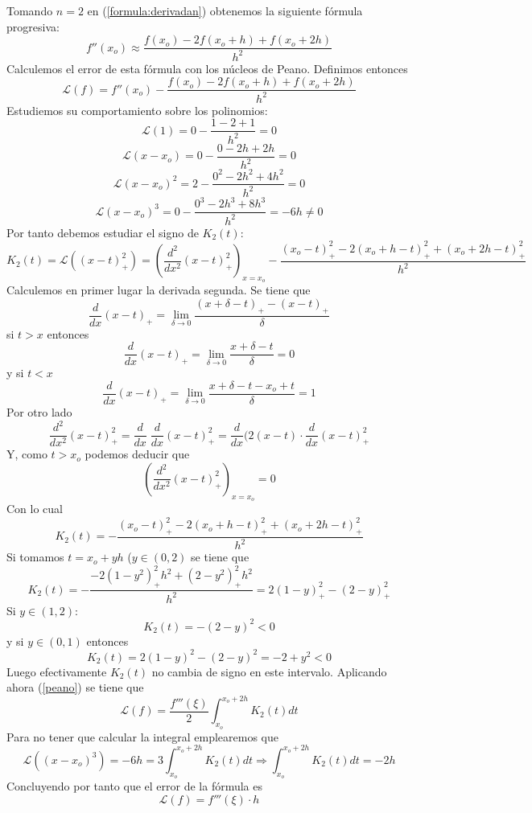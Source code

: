   \begin{ejem}
        Tomando $n=2$ en (\ref{formula:derivadan}) obtenemos la siguiente fórmula progresiva:
        $$f''(x_o)\approx\dfrac{f(x_o)-2f(x_o+h)+f(x_o+2h)}{h^2}$$
        Calculemos el error de esta fórmula con los núcleos de Peano. Definimos entonces
        $$\mathcal{L}(f)=f''(x_o)-\dfrac{f(x_o)-2f(x_o+h)+f(x_o+2h)}{h^2}$$
        Estudiemos su comportamiento sobre los polinomios:
        $$\mathcal{L}(1)=0-\dfrac{1-2+1}{h^2}=0$$
        $$\mathcal{L}(x-x_o)=0-\dfrac{0-2h+2h}{h^2}=0$$
        $$\mathcal{L}(x-x_o)^2=2-\dfrac{0^2-2h^2+4h^2}{h^2}=0$$
        $$\mathcal{L}(x-x_o)^3=0-\dfrac{0^3-2h^3+8h^3}{h^2}=-6h\neq 0$$
        Por tanto debemos estudiar el signo de $K_2(t)$:
        $$K_2(t)=\mathcal{L}((x-t)_+^2)=\left(\dfrac{d^2}{dx^2}(x-t)_+^2\right)_{x=x_o}-\dfrac{(x_o-t)_+^2-2(x_o+h-t)_+^2+(x_o+2h-t)_+^2}{h^2}$$
        Calculemos en primer lugar la derivada segunda. Se tiene que
        $$\dfrac{d}{dx}(x-t)_+=\lim_{\delta\to 0}\dfrac{(x+\delta-t)_+-(x-t)_+}{\delta}$$
        si $t>x$ entonces
        $$\dfrac{d}{dx}(x-t)_+=\lim_{\delta\to 0}\dfrac{x+\delta-t}{\delta}=0$$
        y si $t<x$
        $$\dfrac{d}{dx}(x-t)_+=\lim_{\delta\to 0}\dfrac{x+\delta-t-x_o+t}{\delta}=1$$
        Por otro lado
        $$\dfrac{d^2}{dx^2}(x-t)_+^2=\dfrac{d}{dx}\;\dfrac{d}{dx}(x-t)_+^2=\dfrac{d}{dx}(2(x-t)\cdot \dfrac{d}{dx}(x-t)_+^2$$
        Y, como $t>x_o$ podemos deducir que
        $$\left(\dfrac{d^2}{dx^2}(x-t)_+^2\right)_{x=x_o}=0$$
        Con lo cual
        $$K_2(t)=-\dfrac{(x_o-t)_+^2-2(x_o+h-t)_+^2+(x_o+2h-t)_+^2}{h^2}$$
        Si tomamos $t=x_o+yh$ ($y\in (0,2)$ se tiene que
        $$K_2(t)=-\dfrac{-2(1-y^2)_+^2h^2+(2-y^2)_+^2h^2}{h^2}=2(1-y)_+^2-(2-y)^2_+$$
        Si $y\in(1,2)$:
        $$K_2(t)=-(2-y)^2<0$$ 
        y si $y\in (0,1)$ entonces
        $$K_2(t)=2(1-y)^2-(2-y)^2=-2+y^2<0$$        
       Luego efectivamente $K_2(t)$ no cambia de signo en este intervalo. Aplicando ahora (\ref{peano}) se tiene que
        $$\mathcal{L}(f)=\dfrac{f'''(\xi)}{2}\int_{x_o}^{x_o+2h}K_2(t)dt$$
        Para no tener que calcular la integral emplearemos que
        $$\mathcal{L}((x-x_o)^3)=-6h=3\int_{x_o}^{x_o+2h}K_2(t)dt\Rightarrow\int_{x_o}^{x_o+2h}K_2(t)dt=-2h$$
        Concluyendo por tanto que el error de la fórmula es
        $$\mathcal{L}(f)=f'''(\xi)\cdot h$$
        
        

        \end{ejem}

